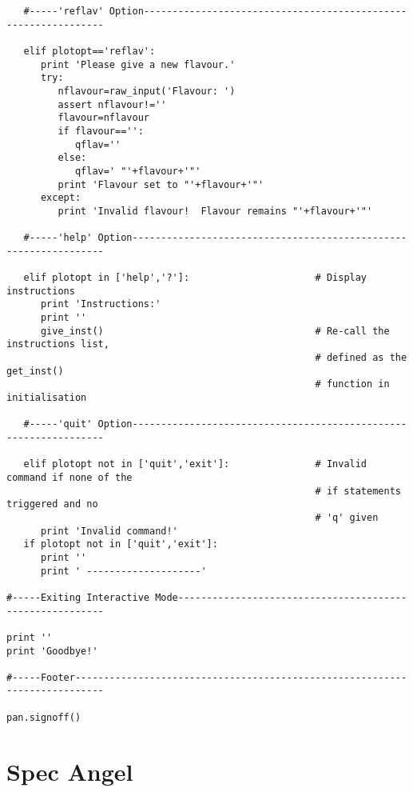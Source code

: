 \begin{verbatim}
   #-----'reflav' Option---------------------------------------------------------------

   elif plotopt=='reflav':
      print 'Please give a new flavour.'
      try:
         nflavour=raw_input('Flavour: ')
         assert nflavour!=''
         flavour=nflavour
         if flavour=='':
            qflav=''
         else:
            qflav=' "'+flavour+'"'
         print 'Flavour set to "'+flavour+'"'
      except:
         print 'Invalid flavour!  Flavour remains "'+flavour+'"'

   #-----'help' Option-----------------------------------------------------------------

   elif plotopt in ['help','?']:                      # Display instructions
      print 'Instructions:'
      print ''
      give_inst()                                     # Re-call the instructions list,
                                                      # defined as the get_inst()
                                                      # function in initialisation

   #-----'quit' Option-----------------------------------------------------------------
   
   elif plotopt not in ['quit','exit']:               # Invalid command if none of the
                                                      # if statements triggered and no
                                                      # 'q' given
      print 'Invalid command!'
   if plotopt not in ['quit','exit']:
      print ''
      print ' --------------------'

#-----Exiting Interactive Mode---------------------------------------------------------

print ''
print 'Goodbye!'                                           

#-----Footer---------------------------------------------------------------------------

pan.signoff()

\end{verbatim}

\section{Spec Angel}

